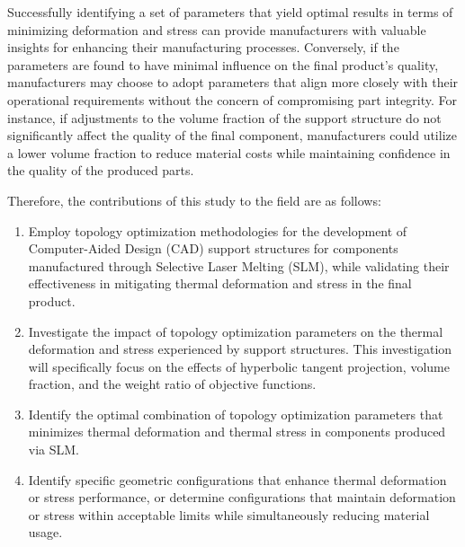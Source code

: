 \documentclass[../main.tex]{subfiles}
\begin{document}
Successfully identifying a set of parameters that yield optimal results in terms of minimizing deformation and stress can provide manufacturers with valuable insights for enhancing their manufacturing processes. Conversely, if the parameters are found to have minimal influence on the final product's quality, manufacturers may choose to adopt parameters that align more closely with their operational requirements without the concern of compromising part integrity. For instance, if adjustments to the volume fraction of the support structure do not significantly affect the quality of the final component, manufacturers could utilize a lower volume fraction to reduce material costs while maintaining confidence in the quality of the produced parts.

Therefore, the contributions of this study to the field are as follows:
\begin{enumerate}
\item  Employ topology optimization methodologies for the development of Computer-Aided Design (CAD) support structures for components manufactured through Selective Laser Melting (SLM), while validating their effectiveness in mitigating thermal deformation and stress in the final product.
\item Investigate the impact of topology optimization parameters on the thermal deformation and stress experienced by support structures. This investigation will specifically focus on the effects of hyperbolic tangent projection, volume fraction, and the weight ratio of objective functions.
\item Identify the optimal combination of topology optimization parameters that minimizes thermal deformation and thermal stress in components produced via SLM.
\item Identify specific geometric configurations that enhance thermal deformation or stress performance, or determine configurations that maintain deformation or stress within acceptable limits while simultaneously reducing material usage.



\end{enumerate}
\end{document}
